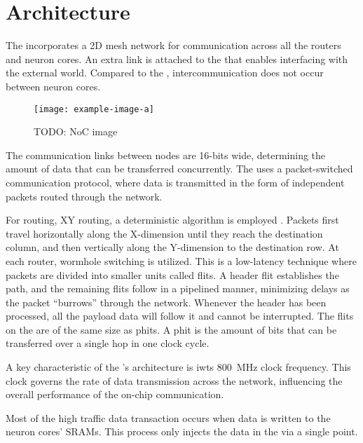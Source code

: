 \section{Architecture}
The \confignoc{} incorporates a 2D mesh network for communication across all the routers and neuron cores.
An extra link is attached to the \confignoc{} that enables interfacing with the external world.
Compared to the \eventnoc{}, intercommunication does not occur between neuron cores.

\begin{figure}[hbtp]
\centering    
\texttt{[image: example-image-a]}
\caption{TODO: NoC image}
\end{figure}

The communication links between nodes are 16-bits wide, determining the amount of data that can be transferred concurrently.
The \confignoc{} uses a packet-switched communication protocol, where data is transmitted in the form of independent packets routed through the network.

For routing, XY routing, a deterministic algorithm is employed \cite{}.
Packets first travel horizontally along the X-dimension until they reach the destination column, and then vertically along the Y-dimension to the destination row.
At each router, wormhole switching is utilized.
This is a low-latency technique where packets are divided into smaller units called flits.
A header flit establishes the path, and the remaining flits follow in a pipelined manner, minimizing delays as the packet ``burrows'' through the network.
Whenever the header has been processed, all the payload data will follow it and cannot be interrupted.
The flits on the \confignoc{} are of the same size as phits.
A phit is the amount of bits that can be transferred over a single hop in one clock cycle.

A key characteristic of the \confignoc{}'s architecture is iwts \SI{800}{MHz} clock frequency.
This clock governs the rate of data transmission across the network, influencing the overall performance of the on-chip communication.

Most of the high traffic data transaction occurs when data is written to the neuron cores' SRAMs.
This process only injects the data in the \confignoc{} via a single point.
